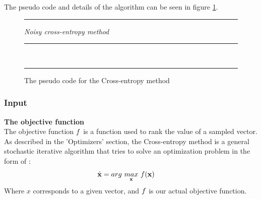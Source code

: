 The pseudo code and details of the algorithm can be seen in figure
\ref{fig:ceCode}.

\begin{figure}[H]
\hrule
\vspace{0.2cm}
{\centering  \textit{Noisy cross-entropy method}}
\vspace{0.2cm}
\hrule
\begin{algorithmic}
\\

\Loop
{}
\EndLoop
\end{algorithmic}
\hrule
\caption{The pseudo code for the Cross-entropy method \label{fig:ceCode}}
\end{figure}

\subsubsection{Input}

\textbf{The objective function \label{CEObjective}} \\
The objective function $f$ is a 
function used to rank the value of a sampled vector.
As described in the 'Optimizers' section, the Cross-entropy method is a general stochastic 
iterative algorithm that tries to solve an optimization problem in the form of \citep{thiery:09}:
\begin{align}
\hat{\textbf{\individual }} &= 
arg \  \underset{\textbf{\individual }}{max} \  
\fitnessFunction (\textbf{\individual }) \ 
\end{align}
Where $x$ corresponds to a given vector, 
and $f$ is our actual objective function. 
\\

